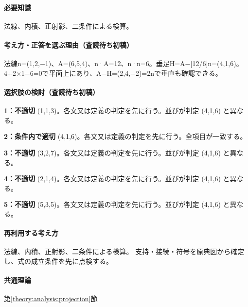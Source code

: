 \paragraph{必要知識} 法線、内積、正射影、二条件による検算。

\paragraph{考え方・正答を選ぶ理由（査読待ち初稿）} 法線n=\allowbreak{}(1,2,−1)、A=\allowbreak{}(6,5,4)、n·A=\allowbreak{}12、n·n=\allowbreak{}6。垂足H=\allowbreak{}A−[12/6]n=\allowbreak{}(4,1,6)。4+2×1−6=\allowbreak{}0で平面上にあり、A−H=\allowbreak{}(2,4,−2)=\allowbreak{}2nで垂直も確認できる。

\paragraph{選択肢の検討（査読待ち初稿）}\mbox{}\par

\noindent\textbf{1：不適切} (1,1,3)。各文又は定義の判定を先に行う。並びが判定 (4,1,6) と異なる。\par

\noindent\textbf{2：条件内で適切} (4,1,6)。各文又は定義の判定を先に行う。全項目が一致する。\par

\noindent\textbf{3：不適切} (3,2,7)。各文又は定義の判定を先に行う。並びが判定 (4,1,6) と異なる。\par

\noindent\textbf{4：不適切} (2,1,4)。各文又は定義の判定を先に行う。並びが判定 (4,1,6) と異なる。\par

\noindent\textbf{5：不適切} (5,3,5)。各文又は定義の判定を先に行う。並びが判定 (4,1,6) と異なる。\par

\paragraph{再利用する考え方} 法線、内積、正射影、二条件による検算。 支持・接続・符号を原典図から確定し、式の成立条件を先に点検する。

\paragraph{共通理論} \hyperref[theory:analysis:projection]{第\ref*{theory:analysis:projection}節}


